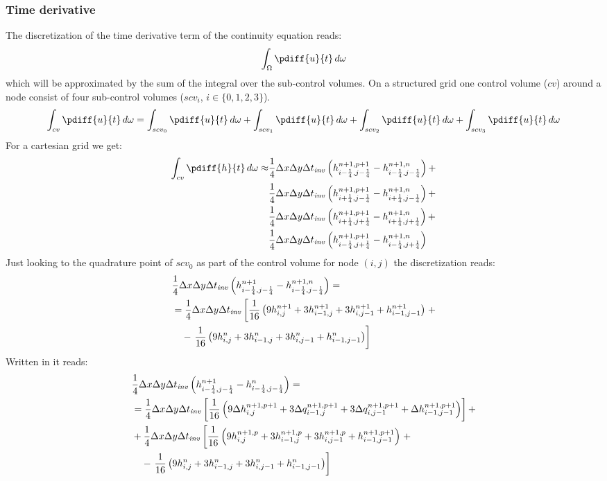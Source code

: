 \subsubsection{Time derivative}
The discretization of the time derivative term of the continuity equation reads:
\begin{align}
    \int_{\Omega} \pdiff{u}{t}\, d\omega
\end{align}
which will be approximated by the sum of the integral over the sub-control volumes.
On a structured grid one control volume ($cv$) around a node consist of four sub-control volumes ($scv_i$, $i\in\{0,1,2,3\}$).
\begin{align}
    \int_{cv} \pdiff{u}{t}\, d\omega =
    \int_{scv_0} \pdiff{u}{t}\, d\omega +
    \int_{scv_1} \pdiff{u}{t}\, d\omega +
    \int_{scv_2} \pdiff{u}{t}\, d\omega +
    \int_{scv_3} \pdiff{u}{t}\, d\omega
\end{align}
For a cartesian grid we get:
\begin{align}
    \int_{cv} \pdiff{h}{t}\, d\omega \approx &
    \quart\Dx\Dy\Dtinv \left( h^{n+1,p+1}_{i-\quart, j-\quart} -  h^{n+1,n}_{i-\quart, j-\quart} \right) +
    \nonumber \\*
    &\quart\Dx\Dy\Dtinv \left( h^{n+1,p+1}_{i+\quart, j-\quart} -  h^{n+1,n}_{i+\quart, j-\quart} \right) +
    \nonumber \\*
    &\quart\Dx\Dy\Dtinv \left( h^{n+1,p+1}_{i+\quart, j+\quart} -  h^{n+1,n}_{i+\quart, j+\quart} \right) +
    \nonumber \\*
    &\quart\Dx\Dy\Dtinv \left( h^{n+1,p+1}_{i-\quart, j+\quart} -  h^{n+1,n}_{i-\quart, j+\quart} \right)
\end{align}
Just looking to the quadrature point of $scv_0$ as part of the control volume for node $(i,j)$ the discretization reads:
\begin{align}
    &\frac{1}{4}\Delta x\Delta y\Delta t_{\it{inv}} \left( h^{n+1}_{i-\frac{1}{4}, j-\frac{1}{4}} -  h^{n+1,n}_{i-\frac{1}{4}, j-\frac{1}{4}} \right) =
    \\*
    &= \frac{1}{4}\Delta x\Delta y\Delta t_{\it{inv}} \left[ \frac{1}{16}\left( 9h^{n+1}_{i, j} + 3 h^{n+1}_{i-1,j}  + 3  h^{n+1}_{i, j-1} + h^{n+1}_{i-1, j-1}\right) \right. +
    \\*
    &\quad - \left. \frac{1}{16}\left( 9 h^{n}_{i, j} +  3 h^{n}_{i-1,j}  + 3  h^{n}_{i, j-1} + h^{n}_{i-1, j-1}\right)\right]
\end{align}
Written in \deltaformulation  it reads:
\begin{align}
    &\frac{1}{4}\Delta x\Delta y\Delta t_{\it{inv}} \left( h^{n+1}_{i-\frac{1}{4}, j-\frac{1}{4}} -  h^{n}_{i-\frac{1}{4}, j-\frac{1}{4}} \right) =
    \nonumber \\*
    &=\frac{1}{4}\Delta x\Delta y\Delta t_{\it{inv}} \left[ \frac{1}{16}\left( 9 \Delta h^{n+1,p+1}_{i, j} + 3 \Delta q^{n+1,p+1}_{i-1,j}  + 3 \Delta q^{n+1,p+1}_{i, j-1} + \Delta h^{n+1,p+1}_{i-1, j-1}\right) \right] +
    \nonumber \\*
    & + \frac{1}{4}\Delta x\Delta y\Delta t_{\it{inv}} \left[ \frac{1}{16}\left( 9 h^{n+1,p}_{i, j} + 3 h^{n+1,p}_{i-1,j}  + 3 h^{n+1,p}_{i, j-1} + h^{n+1,p+1}_{i-1, j-1}\right) \right. +
    \nonumber \\*
    &\quad - \left. \frac{1}{16}\left( 9h^{n}_{i, j} +  3 h^{n}_{i-1,j}  + 3  h^{n}_{i, j-1} + h^{n}_{i-1, j-1}\right)\right]
\end{align}

